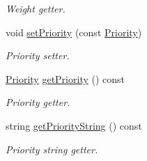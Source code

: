 \begin{DoxyCompactItemize}
\begin{DoxyCompactList}\small\item\em Weight getter. \end{DoxyCompactList}\item 
void \hyperlink{classPackage_afe16b4fbff0a050019ddf47978001464}{set\+Priority} (const \hyperlink{classPackage_ac96ebcf78f2d93898635a1275da0c0bd}{Priority})
\begin{DoxyCompactList}\small\item\em Priority setter. \end{DoxyCompactList}\item 
\hyperlink{classPackage_ac96ebcf78f2d93898635a1275da0c0bd}{Priority} \hyperlink{classPackage_accf52df9d08053e7c1c126d747e6beb0}{get\+Priority} () const 
\begin{DoxyCompactList}\small\item\em Priority getter. \end{DoxyCompactList}\item 
string \hyperlink{classPackage_aaf5a625d7851e24dd18bae23309c03d7}{get\+Priority\+String} () const 
\begin{DoxyCompactList}\small\item\em Priority string getter. \end{DoxyCompactList}\end{DoxyCompactItemize}
